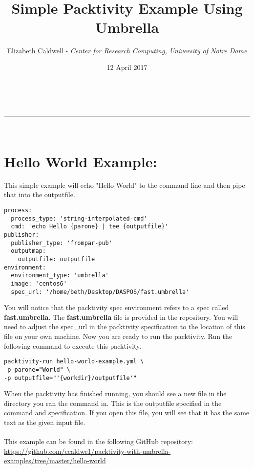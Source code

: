 \documentclass[a4paper,11pt]{article}
\makeatletter
\newcommand{\linia}{\rule{\linewidth}{0.5pt}}
\theoremstyle{mytheor}
\renewcommand{\maketitle}{
\begin{center}
\vspace{2ex}
{\huge \textsc{\@title}}
\vspace{1ex}
\\
\linia\\
\@author \hfill \@date
\vspace{4ex}
\end{center}
}
\makeatother
\begin{document}
\title{Simple Packtivity Example Using Umbrella}

\author{Elizabeth Caldwell - {\it Center for Research Computing, University of Notre Dame}}

\date{12 April 2017}

\maketitle

\section*{Hello World Example: }
This simple example will echo "Hello World" to the command line and then pipe that into the outputfile.
\begin{lstlisting}[label={list:first},caption=packtivity specification: hello-world-example.yml]
process:
  process_type: 'string-interpolated-cmd'
  cmd: 'echo Hello {parone} | tee {outputfile}'
publisher:
  publisher_type: 'frompar-pub'
  outputmap:
    outputfile: outputfile
environment:
  environment_type: 'umbrella'
  image: 'centos6'
  spec_url: '/home/beth/Desktop/DASPOS/fast.umbrella'
\end{lstlisting}
You will notice that the packtivity spec environment refers to a spec called {\bf fast.umbrella}. The {\bf fast.umbrella} file is provided in the repository. You will need to adjust the spec\_url in the packtivity specification to the location of this file on your own machine.
Now you are ready to run the packtivity. Run the following command to execute this packtivity.
\begin{lstlisting}[label={list:first},caption=packtivity-run command]
packtivity-run hello-world-example.yml \
-p parone="World" \
-p outputfile="'{workdir}/outputfile'"
\end{lstlisting}
When the packtivity has finished running, you should see a new file in the directory you ran the command in. This is the outputfile specified in the command and specification. If you open this file, you will see that it has the same text as the given input file.
\\\\This example can be found in the following GitHub repository: \\\url{https://github.com/ecaldwe1/packtivity-with-umbrella-examples/tree/master/hello-world}
\end{document}
